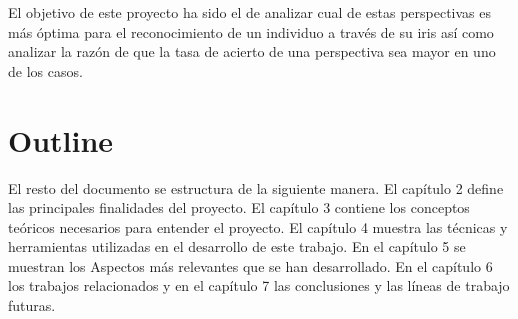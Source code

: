 El objetivo de este proyecto ha sido el de analizar cual de estas perspectivas es más óptima para el reconocimiento de un individuo a través de su iris así como analizar la razón de que la tasa de acierto de una perspectiva sea mayor en uno de los casos.

\section{Outline}

El resto del documento se estructura de la siguiente manera. El capítulo 2  define las principales finalidades del proyecto. El capítulo 3  contiene los conceptos teóricos necesarios
para entender el proyecto. El capítulo 4  muestra las técnicas y herramientas utilizadas en el desarrollo de este trabajo. En el capítulo 5  se muestran los Aspectos
más relevantes que se han desarrollado. En el capítulo 6  los trabajos relacionados y en el capítulo 7  las conclusiones y las líneas de trabajo futuras.
